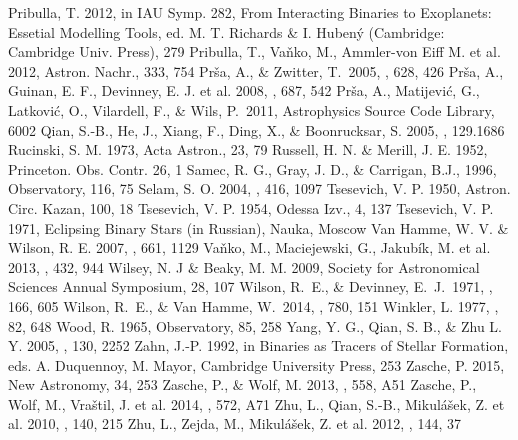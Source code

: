 \documentclass{aa}
\begin{document}
\begin{thebibliography}{}
 Pribulla, T. 2012, in IAU Symp. 282, From Interacting Binaries to Exoplanets: Essetial Modelling Tools, ed. M. T. Richards \& I. Huben\'y (Cambridge: Cambridge Univ. Press), 279
 Pribulla, T., Va\v{n}ko, M., Ammler-von Eiff M. et al. 2012, Astron. Nachr., 333, 754
 Pr\v{s}a, A., \& Zwitter, T.\ 2005, \apj, 628, 426
 Pr\v{s}a, A., Guinan, E. F., Devinney, E. J. et al. 2008, \apj, 687, 542
 Pr\v{s}a, A., Matijevi\'{c}, G., Latkovi\'{c}, O., Vilardell, F., \& Wils,     P.\ 2011, Astrophysics Source Code Library, 6002
 Qian, S.-B., He, J., Xiang, F., Ding, X., \& Boonrucksar, S. 2005, \aj, 129.1686
 Rucinski, S. M. 1973, Acta Astron., 23, 79
 Russell, H. N. \& Merill, J. E. 1952, Princeton. Obs. Contr. 26, 1
 Samec, R. G., Gray, J. D., \& Carrigan, B.J., 1996, Observatory, 116, 75
 Selam, S. O. 2004, \aap, 416, 1097
 Tsesevich, V. P. 1950, Astron. Circ. Kazan, 100, 18
 Tsesevich, V. P. 1954, Odessa Izv., 4, 137
 Tsesevich, V. P. 1971, Eclipsing Binary Stars (in Russian), Nauka, Moscow
 Van Hamme, W. V. \& Wilson, R. E. 2007, \apj, 661, 1129
 Va\v{n}ko, M., Maciejewski, G., Jakub\'{i}k, M. et al. 2013, \mnras, 432, 944
 Wilsey, N. J \& Beaky, M. M. 2009,  Society for Astronomical Sciences Annual Symposium, 28, 107
 Wilson, R.~E., \& Devinney, E.~J.\ 1971, \apj, 166, 605
 Wilson, R.~E., \& Van Hamme, W.\ 2014, \apj, 780, 151
 Winkler, L. 1977, \aj, 82, 648
 Wood, R. 1965, Observatory, 85, 258
 Yang, Y. G., Qian, S. B., \& Zhu L. Y. 2005, \aj, 130, 2252
 Zahn, J.-P. 1992, in Binaries as Tracers of Stellar Formation, eds. A. Duquennoy, M. Mayor, Cambridge University Press, 253
 Zasche, P. 2015, New Astronomy, 34, 253
 Zasche, P., \& Wolf, M. 2013, \aap, 558, A51
 Zasche, P., Wolf, M., Vra\v{s}til, J. et al. 2014, \aap, 572, A71
 Zhu, L., Qian, S.-B., Mikul\'a\v{s}ek, Z. et al. 2010, \aj, 140, 215
 Zhu, L., Zejda, M., Mikul\'a\v{s}ek, Z. et al. 2012, \aj, 144, 37
\end{thebibliography}
\end{document}
